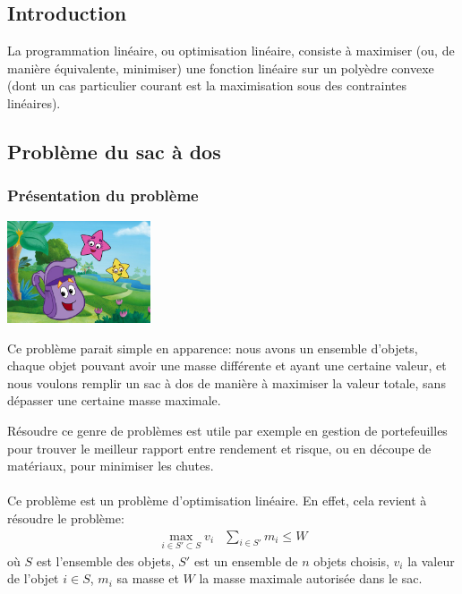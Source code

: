 \subsection{Introduction}
  La programmation linéaire, ou optimisation linéaire, consiste à maximiser (ou,
  de manière équivalente, minimiser) une fonction linéaire sur un polyèdre
  convexe (dont un cas particulier courant est la maximisation sous des 
  contraintes linéaires).

\subsection{Problème du sac à dos}
  \subsubsection{Présentation du problème}
    \begin{center}\includegraphics[width=120pt]{sac_a_dos.jpg}\end{center}

    Ce problème parait simple en apparence: nous avons un ensemble d'objets,
    chaque objet pouvant avoir une masse différente et ayant une certaine
    valeur, et nous voulons remplir un sac à dos de manière à maximiser la
    valeur totale, sans dépasser une certaine masse maximale.

    Résoudre ce genre de problèmes est utile par exemple en gestion de
    portefeuilles pour trouver le meilleur rapport entre rendement et risque,
    ou en découpe de matériaux, pour minimiser les chutes.

    \paragraph{}
    Ce problème est un problème d'optimisation linéaire. En effet, cela revient
    à résoudre le problème:
    \[ \begin{array}{r|l}
        \displaystyle\max_{i \in S' \subset S} v_i &
        \displaystyle\sum_{i \in S'} m_i \leq W
      \end{array}
    \]
    où $S$ est l'ensemble des objets, $S'$ est un ensemble de $n$ objets
    choisis, $v_i$ la valeur de l'objet $i \in S$, $m_i$ sa masse et $W$ la
    masse maximale autorisée dans le sac.

